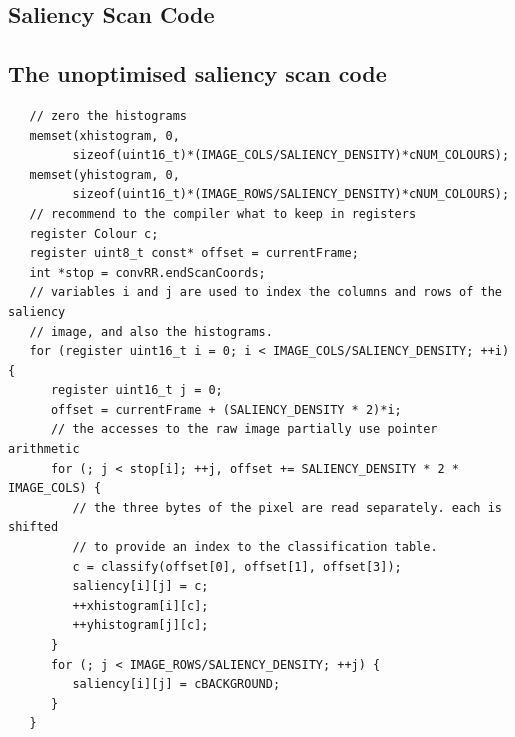 \documentclass[pdftex,11pt,a4paper]{report}
\begin{document}
\begin{notesfornextyear}
\newpage
\chapter{Saliency Scan Code}
\label{saliencyScanCode}
\section{The unoptimised saliency scan code}
\lstset{language=C++}
\begin{lstlisting}
   // zero the histograms
   memset(xhistogram, 0,
         sizeof(uint16_t)*(IMAGE_COLS/SALIENCY_DENSITY)*cNUM_COLOURS);
   memset(yhistogram, 0,
         sizeof(uint16_t)*(IMAGE_ROWS/SALIENCY_DENSITY)*cNUM_COLOURS);
   // recommend to the compiler what to keep in registers
   register Colour c;
   register uint8_t const* offset = currentFrame;
   int *stop = convRR.endScanCoords;
   // variables i and j are used to index the columns and rows of the saliency
   // image, and also the histograms.
   for (register uint16_t i = 0; i < IMAGE_COLS/SALIENCY_DENSITY; ++i) {
      register uint16_t j = 0;
      offset = currentFrame + (SALIENCY_DENSITY * 2)*i;
      // the accesses to the raw image partially use pointer arithmetic
      for (; j < stop[i]; ++j, offset += SALIENCY_DENSITY * 2 * IMAGE_COLS) {
         // the three bytes of the pixel are read separately. each is shifted
         // to provide an index to the classification table.
         c = classify(offset[0], offset[1], offset[3]);
         saliency[i][j] = c;
         ++xhistogram[i][c];
         ++yhistogram[j][c];
      }
      for (; j < IMAGE_ROWS/SALIENCY_DENSITY; ++j) {
         saliency[i][j] = cBACKGROUND;
      }
   }
\end{lstlisting}

\end{notesfornextyear}
\end{document}
